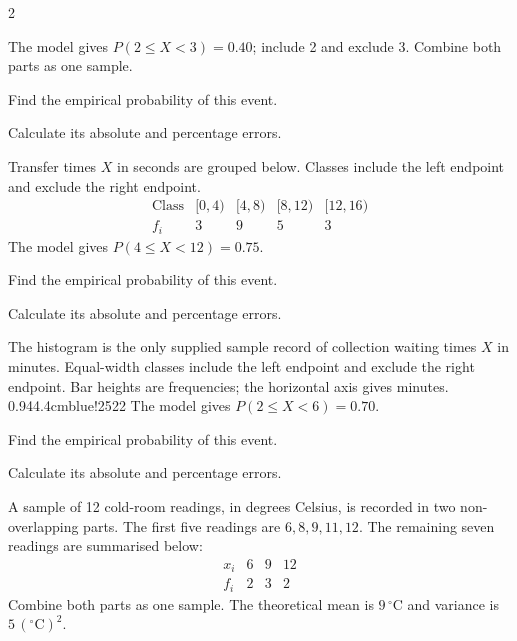 \begin{multicols}{2}
\newpage 

The model gives $P(2\le X<3)=0.40$; include 2 and exclude 3. Combine both parts as one sample.

Find the empirical probability of this event. 

Calculate its absolute and percentage errors. 


\begin{minipage}{\linewidth}
Transfer times $X$ in seconds are grouped below. Classes include the left endpoint and exclude the right endpoint.
\[
\begin{array}{c|rrrr}
\text{Class}&[0,4)&[4,8)&[8,12)&[12,16)\\\hline
f_i&3&9&5&3
\end{array}
\]
The model gives $P(4\le X<12)=0.75$.

Find the empirical probability of this event. 

Calculate its absolute and percentage errors. 

\end{minipage}\par
\begin{minipage}{\linewidth}
The histogram is the only supplied sample record of collection waiting times $X$ in minutes. Equal-width classes include the left endpoint and exclude the right endpoint. Bar heights are frequencies; the horizontal axis gives minutes.
{0.94\linewidth}{4.4cm}{blue!25}{2}{2}
The model gives $P(2\le X<6)=0.70$.

Find the empirical probability of this event. 

Calculate its absolute and percentage errors. 

\end{minipage}\par
\begin{minipage}{\linewidth}

A sample of 12 cold-room readings, in degrees Celsius, is recorded in two non-overlapping parts. The first five readings are $6,8,9,11,12$. The remaining seven readings are summarised below:
\[
\begin{array}{c|rrr}x_i&6&9&12\\\hline f_i&2&3&2\end{array}
\]
Combine both parts as one sample. The theoretical mean is $9\,{}^\circ\mathrm C$ and variance is $5\,({}^\circ\mathrm C)^2$.


\end{minipage}
\end{multicols}
